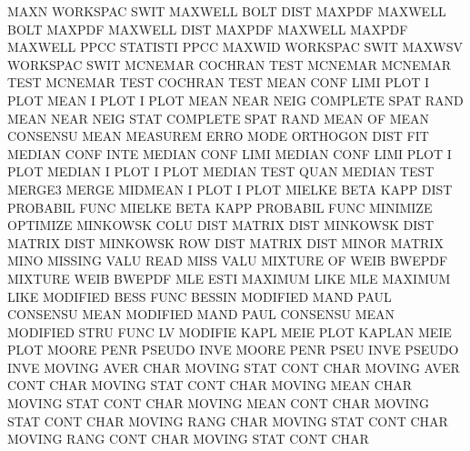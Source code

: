 MAXN                                    WORKSPAC SWIT
MAXWELL  BOLT DIST                      MAXPDF
MAXWELL  BOLT                           MAXPDF
MAXWELL  DIST                           MAXPDF
MAXWELL                                 MAXPDF
MAXWELL  PPCC                           STATISTI PPCC
MAXWID                                  WORKSPAC SWIT
MAXWSV                                  WORKSPAC SWIT
MCNEMAR                                 COCHRAN  TEST
MCNEMAR                                 MCNEMAR  TEST
MCNEMAR  TEST                           COCHRAN  TEST
MEAN     CONF LIMI PLOT                 I        PLOT
MEAN     I    PLOT                      I        PLOT
MEAN     NEAR NEIG                      COMPLETE SPAT RAND
MEAN     NEAR NEIG STAT                 COMPLETE SPAT RAND
MEAN     OF   MEAN                      CONSENSU MEAN
MEASUREM ERRO MODE                      ORTHOGON DIST FIT
MEDIAN   CONF INTE                      MEDIAN   CONF LIMI
MEDIAN   CONF LIMI PLOT                 I        PLOT
MEDIAN   I    PLOT                      I        PLOT
MEDIAN   TEST QUAN                      MEDIAN   TEST
MERGE3                                  MERGE
MIDMEAN  I    PLOT                      I        PLOT
MIELKE   BETA KAPP DIST                 PROBABIL FUNC
MIELKE   BETA KAPP                      PROBABIL FUNC
MINIMIZE                                OPTIMIZE
MINKOWSK COLU DIST                      MATRIX   DIST
MINKOWSK DIST                           MATRIX   DIST
MINKOWSK ROW  DIST                      MATRIX   DIST
MINOR                                   MATRIX   MINO
MISSING  VALU                           READ     MISS VALU 
MIXTURE  OF   WEIB                      BWEPDF
MIXTURE  WEIB                           BWEPDF
MLE      ESTI                           MAXIMUM  LIKE
MLE                                     MAXIMUM  LIKE
MODIFIED BESS FUNC                      BESSIN
MODIFIED MAND PAUL                      CONSENSU MEAN
MODIFIED MAND PAUL                      CONSENSU MEAN
MODIFIED STRU FUNC                      LV
MODIFIE  KAPL MEIE PLOT                 KAPLAN   MEIE PLOT
MOORE    PENR                           PSEUDO   INVE
MOORE    PENR PSEU INVE                 PSEUDO   INVE
MOVING   AVER CHAR                      MOVING   STAT CONT CHAR
MOVING   AVER CONT CHAR                 MOVING   STAT CONT CHAR
MOVING   MEAN CHAR                      MOVING   STAT CONT CHAR
MOVING   MEAN CONT CHAR                 MOVING   STAT CONT CHAR
MOVING   RANG CHAR                      MOVING   STAT CONT CHAR
MOVING   RANG CONT CHAR                 MOVING   STAT CONT CHAR

